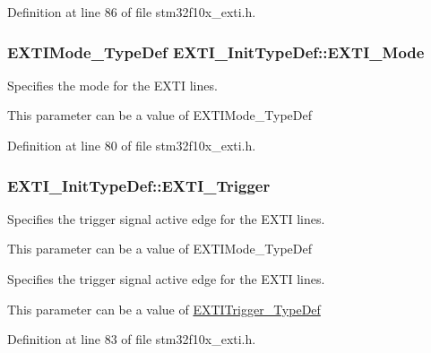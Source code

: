 Definition at line 86 of file stm32f10x\-\_\-exti.\-h.

\hypertarget{struct_e_x_t_i___init_type_def_a741816862b9cd43cc80781dc89150e7e}{
\subsubsection[{E\-X\-T\-I\-\_\-\-Mode}]{\setlength{\rightskip}{0pt plus 5cm}E\-X\-T\-I\-Mode\-\_\-\-Type\-Def E\-X\-T\-I\-\_\-\-Init\-Type\-Def\-::\-E\-X\-T\-I\-\_\-\-Mode}}\label{struct_e_x_t_i___init_type_def_a741816862b9cd43cc80781dc89150e7e}
\begin{DoxyVerb}       Specifies the mode for the EXTI lines.
\end{DoxyVerb}
 This parameter can be a value of E\-X\-T\-I\-Mode\-\_\-\-Type\-Def 

Definition at line 80 of file stm32f10x\-\_\-exti.\-h.

\hypertarget{struct_e_x_t_i___init_type_def_ab0bd8417e78fe2b43eed79e44064510c}{
\subsubsection[{E\-X\-T\-I\-\_\-\-Trigger}]{ E\-X\-T\-I\-\_\-\-Init\-Type\-Def\-::\-E\-X\-T\-I\-\_\-\-Trigger}}\label{struct_e_x_t_i___init_type_def_ab0bd8417e78fe2b43eed79e44064510c}
\begin{DoxyVerb} Specifies the trigger signal active edge for the EXTI lines.
\end{DoxyVerb}
 This parameter can be a value of E\-X\-T\-I\-Mode\-\_\-\-Type\-Def

\begin{DoxyVerb} Specifies the trigger signal active edge for the EXTI lines.
\end{DoxyVerb}
 This parameter can be a value of \hyperlink{stm32f4xx__exti_8h_a9da190f5425d1b421a06bced8cc48e9b}{E\-X\-T\-I\-Trigger\-\_\-\-Type\-Def} 

Definition at line 83 of file stm32f10x\-\_\-exti.\-h.



